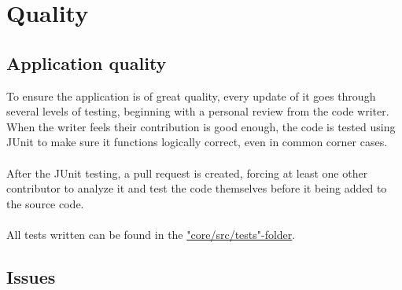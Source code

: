 \section{Quality}
\begin{comment}
	\begin{itemize}
		\item Describe how you test your application and where to find these tests. If
			  applicable, give a link to your continuous integration.
		\item List all known issues.
		\item Run analytical tools on your software and show the results. Use for example:
			  \begin{itemize}
				  \item Dependencies: \href{http://stan4j.com/}{STAN} or similar.
				  \item Quality tool reports, like \href{http://filehippo.com/download_pmd/}{PMD}.
			  \end{itemize}
	\end{itemize}

	NOTE: Each Java, XML, etc. file should have a header comment: Author,
	responsibility, used by ..., uses ..., etc.
\end{comment}
\subsection{Application quality}
To ensure the application is of great quality, every update of it goes through several levels of testing, beginning with a personal review from the code writer. When the writer feels their contribution is good enough, the code is tested using JUnit\cite{JUnit} to make sure it functions logically correct, even in common corner cases.\\
\\
After the JUnit testing, a pull request is created, forcing at least one other contributor to analyze it and test the code themselves before it being added to the source code.\\
\\
All tests written can be found in the \href{https://github.com/Krysset/TDA367-Projektgrupp-16/tree/main/core/src/test/java/com/g16/feyrune}{"core/src/tests"-folder}.

\subsection{Issues}


\begin{comment}
\subsection{Analytics feedback}

\subsection{Access control and security}
This section shan't be needed
\end{comment}